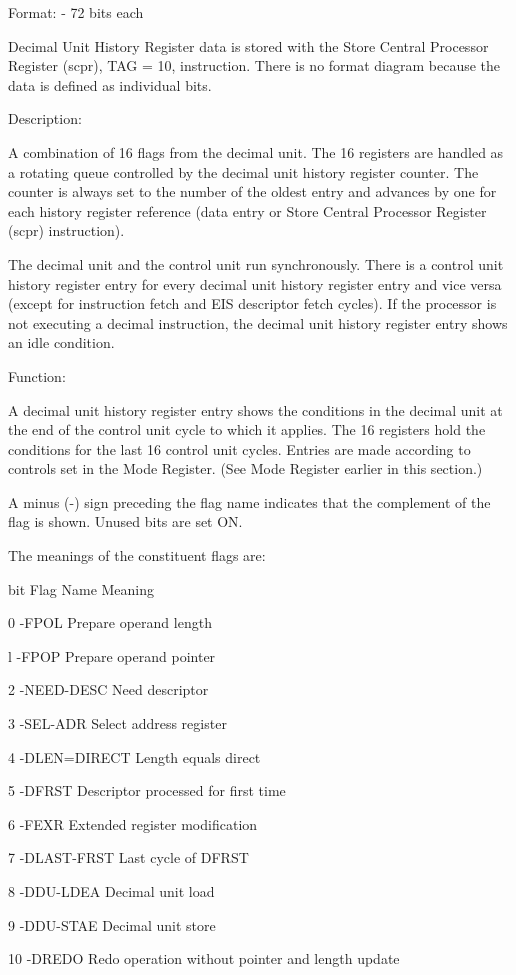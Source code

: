 Format: - 72 bits each

Decimal Unit History Register data is stored with the Store Central Processor
Register (scpr), TAG = 10, instruction. There is no format diagram because the
data is defined as individual bits.

Description:

A combination of 16 flags from the decimal unit. The 16 registers are handled
as a rotating queue controlled by the decimal unit history register counter.
The counter is always set to the number of the oldest entry and advances by one
for each history register reference (data entry or Store Central Processor
Register (scpr) instruction).

The decimal unit and the control unit run synchronously. There is a control
unit history register entry for every decimal unit history register entry and
vice versa (except for instruction fetch and EIS descriptor fetch cycles). If
the processor is not executing a decimal instruction, the decimal unit history
register entry shows an idle condition.

Function:

A decimal unit history register entry shows the conditions in the decimal unit
at the end of the control unit cycle to which it applies. The 16 registers hold
the conditions for the last 16 control unit cycles. Entries are made according
to controls set in the Mode Register.  (See Mode Register earlier in this
section.)

A minus (-) sign preceding the flag name indicates that the complement of the flag is shown.  Unused bits are set ON.

The meanings of the constituent flags are:

bit Flag Name Meaning

0 -FPOL Prepare operand length

l -FPOP Prepare operand pointer

2 -NEED-DESC Need descriptor

3 -SEL-ADR Select address register

4 -DLEN=DIRECT Length equals direct

5 -DFRST Descriptor processed for first time

6 -FEXR Extended register modification

7 -DLAST-FRST Last cycle of DFRST

8 -DDU-LDEA Decimal unit load

9 -DDU-STAE Decimal unit store

10 -DREDO Redo operation without pointer and length update

